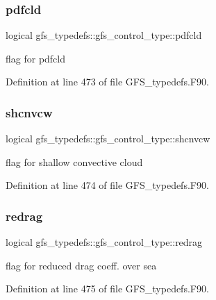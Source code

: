 \subsubsection{pdfcld}
{\footnotesize\ttfamily logical gfs\+\_\+typedefs\+::gfs\+\_\+control\+\_\+type\+::pdfcld}



flag for pdfcld 



Definition at line 473 of file G\+F\+S\+\_\+typedefs.\+F90.

\mbox{\label{structgfs__typedefs_1_1gfs__control__type_aefc3ab3f40f90a0dc91a3b8e7549b8e2}} 
\subsubsection{shcnvcw}
{\footnotesize\ttfamily logical gfs\+\_\+typedefs\+::gfs\+\_\+control\+\_\+type\+::shcnvcw}



flag for shallow convective cloud 



Definition at line 474 of file G\+F\+S\+\_\+typedefs.\+F90.

\mbox{\label{structgfs__typedefs_1_1gfs__control__type_a6f5bd5993e01b368ee74297340ab1253}} 
\subsubsection{redrag}
{\footnotesize\ttfamily logical gfs\+\_\+typedefs\+::gfs\+\_\+control\+\_\+type\+::redrag}



flag for reduced drag coeff. over sea 



Definition at line 475 of file G\+F\+S\+\_\+typedefs.\+F90.

\mbox{\label{structgfs__typedefs_1_1gfs__control__type_a3e4b0d3dac0e8fcd67355dbe1ac22c4d}} 
